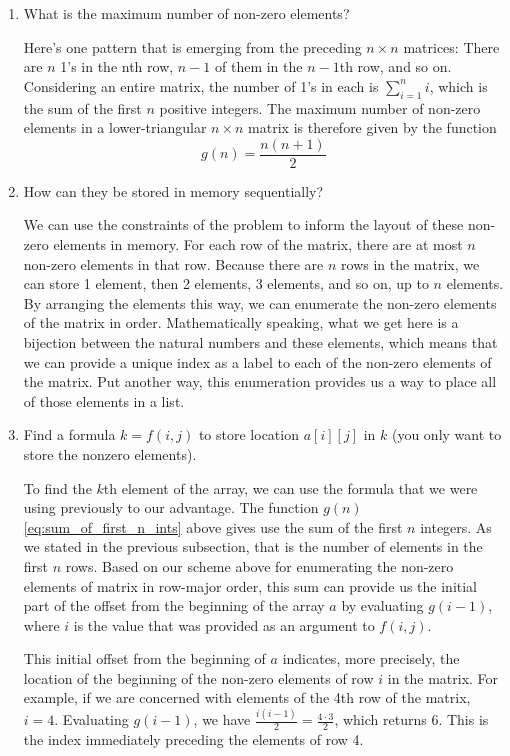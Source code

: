 \documentclass[12pt,letterpaper,final]{report}
\begin{document}
\begin{enumerate}
  \item What is the maximum number of non-zero elements?

        Here's one pattern that is emerging from the preceding $n \times n$ matrices: There are $n$ 1's in the nth row, $n-1$ of them in the $n-1$th row, and so on. Considering an entire matrix, the number of 1's in each is $\sum_{i=1}^{n} i$, which is the sum of the first $n$ positive integers. The maximum number of non-zero elements in a lower-triangular $n \times n$ matrix is therefore given by the function
        \begin{equation}
          g(n) = \frac{n(n+1)}{2} \label{eq:sum_of_first_n_ints}
        \end{equation}
  \item How can they be stored in memory sequentially?

        We can use the constraints of the problem to inform the layout of these non-zero elements in memory. For each row of the matrix, there are at most $n$ non-zero elements in that row. Because there are $n$ rows in the matrix, we can store 1 element, then 2 elements, 3 elements, and so on, up to $n$ elements. By arranging the elements this way, we can enumerate the non-zero elements of the matrix in order. Mathematically speaking, what we get here is a bijection between the natural numbers and these elements, which means that we can provide a unique index as a label to each of the non-zero elements of the matrix. Put another way, this enumeration provides us a way to place all of those elements in a list. \textcite{zimand2026cosc417-lec02}
  \item Find a formula $k = f(i,j)$ to store location $a[i][j]$ in $k$ (you only want to store the nonzero elements).

        To find the $k$th element of the array, we can use the formula that we were using previously to our advantage. The function $g(n)$ \eqref{eq:sum_of_first_n_ints} above gives use the sum of the first $n$ integers. As we stated in the previous subsection, that is the number of elements in the first $n$ rows. Based on our scheme above for enumerating the non-zero elements of matrix in row-major order, this sum can provide us the initial part of the offset from the beginning of the array $a$ by evaluating $g(i-1)$, where $i$ is the value that was provided as an argument to $f(i, j)$.

        This initial offset from the beginning of $a$ indicates, more precisely, the location of the beginning of the non-zero elements of row $i$ in the matrix. For example, if we are concerned with elements of the 4th row of the matrix, $i = 4$. Evaluating $g(i-1)$, we have $\frac{i(i-1)}{2} = \frac{4 \cdot 3}{2}$, which returns $6$. This is the index immediately preceding the elements of row 4.


\end{enumerate}
\end{document}
